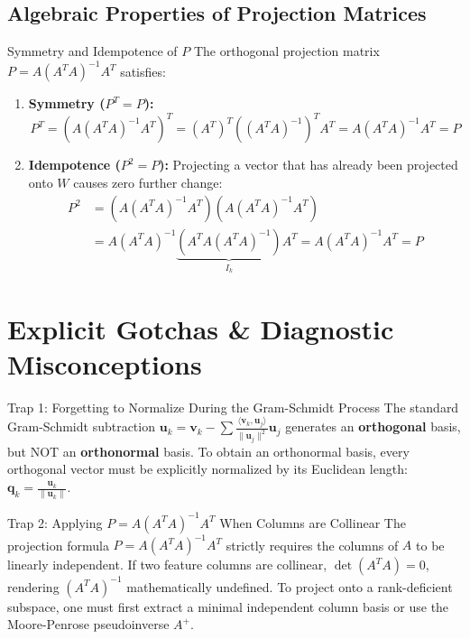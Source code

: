 \subsection{Algebraic Properties of Projection Matrices}

\begin{theorembox}{Symmetry and Idempotence of $P$}
The orthogonal projection matrix $P = A(A^T A)^{-1} A^T$ satisfies:
\begin{enumerate}
    \item \textbf{Symmetry ($P^T = P$):}
    \begin{equation*}
    P^T = \left( A (A^T A)^{-1} A^T \right)^T = (A^T)^T \left( (A^T A)^{-1} \right)^T A^T = A (A^T A)^{-1} A^T = P
    \end{equation*}
    \item \textbf{Idempotence ($P^2 = P$):} Projecting a vector that has already been projected onto $W$ causes zero further change:
    \begin{align*}
    P^2 &= \left( A (A^T A)^{-1} A^T \right) \left( A (A^T A)^{-1} A^T \right) \\
    &= A (A^T A)^{-1} \underbrace{\left( A^T A (A^T A)^{-1} \right)}_{I_k} A^T = A (A^T A)^{-1} A^T = P
    \end{align*}
\end{enumerate}
\end{theorembox}

\section{Explicit Gotchas \& Diagnostic Misconceptions}

\begin{trapbox}{Trap 1: Forgetting to Normalize During the Gram-Schmidt Process}
The standard Gram-Schmidt subtraction $\mathbf{u}_k = \mathbf{v}_k - \sum \frac{\langle \mathbf{v}_k, \mathbf{u}_j \rangle}{\|\mathbf{u}_j\|^2} \mathbf{u}_j$ generates an \textbf{orthogonal} basis, but NOT an \textbf{orthonormal} basis. To obtain an orthonormal basis, every orthogonal vector must be explicitly normalized by its Euclidean length: $\mathbf{q}_k = \frac{\mathbf{u}_k}{\|\mathbf{u}_k\|}$.
\end{trapbox}

\begin{trapbox}{Trap 2: Applying $P = A(A^T A)^{-1} A^T$ When Columns are Collinear}
The projection formula $P = A(A^T A)^{-1} A^T$ strictly requires the columns of $A$ to be linearly independent. If two feature columns are collinear, $\det(A^T A) = 0$, rendering $(A^T A)^{-1}$ mathematically undefined. To project onto a rank-deficient subspace, one must first extract a minimal independent column basis or use the Moore-Penrose pseudoinverse $A^+$.
\end{trapbox}

